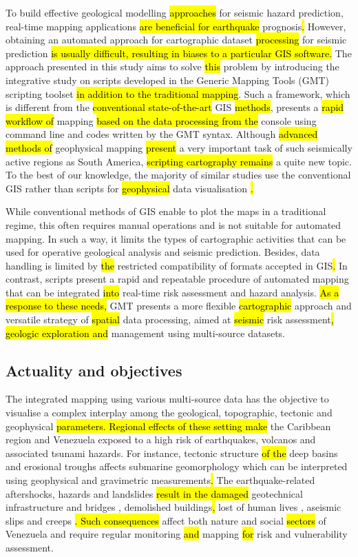 \documentclass[sustainability,article,submit,pdftex,moreauthors]{Definitions/mdpi}
\begin{document}
To build\hl{ }effective geological\hl{ }modelling\hl{ approaches }for seismic hazard prediction,\hl{ }real-time mapping applications\hl{ are beneficial for earthquake} prognosis\hl{. }However, obtaining an {automated approach for }cartographic dataset \hl{processing }for seismic prediction\hl{ is usually difficult, resulting in biases to a particular GIS software. }The approach presented in this study aims to solve \hl{this }problem\hl{ }by introducing the integrative study on scripts developed in the Generic Mapping Tools (GMT) scripting toolset \cite{Wessel}\hl{ in addition to the traditional mapping}. Such a framework, which is different from the \hl{conventional state-of-the-art } GIS \hl{methods}, presents a \hl{rapid workflow of} mapping \hl{based on the data processing from the} console using\hl{ }command line and codes written by the GMT syntax. Although \hl{advanced methods of }geophysical mapping \hl{present }a very important task of such seismically active regions as South America, \hl{scripting cartography remains }a quite new topic. To the best of our knowledge, the majority of similar studies use the conventional GIS rather than scripts for \hl{geophysical }data visualisation \cite{Castillo}\hl{.}

While conventional methods of GIS enable to plot the maps in a traditional regime, this often requires manual operations and is not suitable for automated mapping. In such a way, it limits the types of cartographic activities that can be used for operative geological analysis and seismic prediction. Besides, data handling is limited by \hl{the }restricted compatibility of formats accepted in GIS\hl{. }In contrast, scripts present a rapid and repeatable procedure of automated mapping that can be integrated \hl{into }real-time risk assessment and hazard analysis. \hl{As a response to these needs, }GMT presents a more flexible \hl{cartographic }approach and\hl{ }versatile strategy of \hl{spatial }data processing, aimed at \hl{seismic }risk assessment\hl{, geologic exploration and }management using multi-source datasets. 

\subsection{Actuality and objectives}

The integrated mapping using various multi-source data has the objective to visualise a complex interplay among the geological, topographic, tectonic and geophysical\hl{ parameters. Regional effects of these setting make }the Caribbean region and\hl{ }Venezuela exposed to a high risk of earthquakes,\hl{ }volcanos and associated tsunami hazards. For instance, tectonic structure\hl{ of the }deep basins and erosional troughs affects submarine geomorphology\hl{ }which can be interpreted using geophysical and gravimetric measurements\hl{. }The earthquake-related aftershocks, hazards and\hl{ }landslides \hl{result in the damaged }geotechnical infrastructure and bridges \cite{Salcedo}, demolished buildings\hl{, }lost of human lives \cite{Rodriguez2018}, aseismic slips and creeps \cite{Pousse2016}\hl{. Such consequences }affect both nature and social \hl{sectors }of Venezuela and require regular monitoring \hl{and} mapping\hl{ for }risk and vulnerability assessment. 
\end{document}
